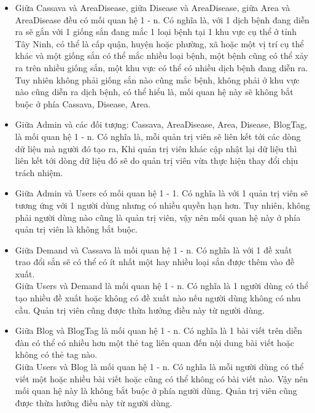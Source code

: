 \documentclass[./../main.tex]{subfiles}
\begin{document}
\begin{itemize}
    \item Giữa Cassava và AreaDisease, giữa Disease và AreaDisease, giữa Area và AreaDisease đều có mối quan hệ 1 - n. Có nghĩa là, với 1 dịch bệnh đang diễn ra sẽ gắn với 1 giống sắn đang mắc 1 loại bệnh tại 1 khu vực cụ thể ở tỉnh Tây Ninh, có thể là cấp quận, huyện hoặc phường, xã hoặc một vị trí cụ thể khác và một giống sắn có thể mắc nhiều loại bệnh, một bệnh cũng có thể xảy ra trên nhiều giống sắn, một khu vực có thể có nhiều dịch bệnh đang diễn ra. Tuy nhiên không phải giống sắn nào cũng mắc bệnh, không phải ở khu vực nào cũng diễn ra dịch bệnh, có thể hiểu là, mối quan hệ này sẽ không bắt buộc ở phía Cassava, Disease, Area.
    \item Giữa Admin và các đối tượng: Cassava, AreaDisease, Area, Disease, BlogTag, là mối quan hệ 1 - n. Có nghĩa là, mỗi quản trị viên sẽ liên kết tới các dòng dữ liệu mà người đó tạo ra, Khi quản trị viên khác cập nhật lại dữ liệu thì liên kết tới dòng dữ liệu đó sẽ do quản trị viên vừa thực hiện thay đổi chịu trách nhiệm.
    \item Giữa Admin và Users có mối quan hệ 1 - 1. Có nghĩa là với 1 quản trị viên sẽ tương ứng với 1 người dùng nhưng có nhiều quyền hạn hơn. Tuy nhiên, không phải người dùng nào cũng là quản trị viên, vậy nên mối quan hệ này ở phía quản trị viên là không bắt buộc.
    \item Giữa Demand và Cassava là mối quan hệ 1 - n. Có nghĩa là với 1 đề xuất trao đổi sắn sẽ có thể có ít nhất một hay nhiều loại sắn được thêm vào đề xuất.\\ Giữa Users và Demand là mối quan hệ 1 - n. Có nghĩa là 1 người dùng có thể tạo nhiều đề xuất hoặc không có đề xuất nào nếu người dùng không có nhu cầu. Quản trị viên cũng được thừa hưởng điều này từ người dùng.
    \item Giữa Blog và BlogTag là mối quan hệ 1 - n. Có nghĩa là 1 bài viết trên diễn đàn có thể có nhiều hơn một thẻ tag liên quan đến nội dung bài viết hoặc không có thẻ tag nào.\\
    Giữa Users và Blog là mối quan hệ 1 - n. Có nghĩa là mỗi người dùng có thể viết một hoặc nhiều bài viết hoặc cũng có thể không có bài viết nào. Vậy nên mối quan hệ này là không bắt buộc ở phía người dùng. Quản trị viên cũng được thừa hưởng điều này từ người dùng.
\end{itemize}
\end{document}
